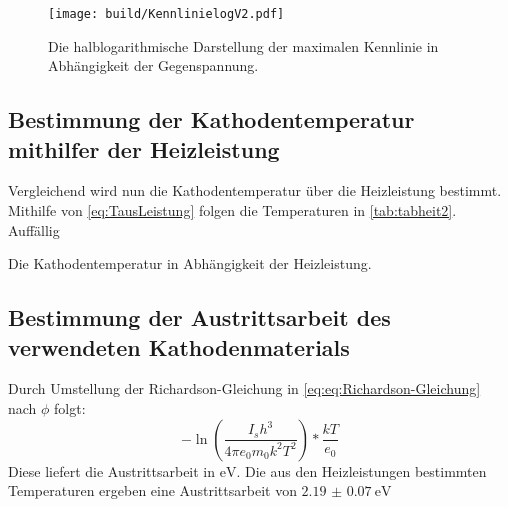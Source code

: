  \begin{figure}
  \centering
  \caption{Die halblogarithmische Darstellung der maximalen Kennlinie in Abhängigkeit der Gegenspannung.}
  \texttt{[image: build/KennlinielogV2.pdf]}
  \label{fig:Graphlog3}
 \end{figure}

\subsection{Bestimmung der Kathodentemperatur mithilfer der Heizleistung}
Vergleichend wird nun die Kathodentemperatur über die Heizleistung bestimmt.
Mithilfe von \ref{eq:TausLeistung} folgen die Temperaturen in \ref{tab:tabheit2}.
Auffällig

\begin{table}
 \centering
 \caption{Die Kathodentemperatur in Abhängigkeit der Heizleistung.}
 
 \label{tab:tabheit2}
\end{table}

\subsection{Bestimmung der Austrittsarbeit des verwendeten Kathodenmaterials}
Durch Umstellung der Richardson-Gleichung in \ref{eq:eq:Richardson-Gleichung} nach
$\phi$ folgt:
\begin{equation}
  -\ln\left(\frac{I_s h^3}{4\pi e_0 m_0 k^2 T^2}\right)*\frac{k T}{e_0}
\end{equation}
Diese liefert die Austrittsarbeit in $\si{\electronvolt}$. Die aus den Heizleistungen
bestimmten Temperaturen ergeben eine Austrittsarbeit von $\SI{2.19(7)}{\electronvolt}$
